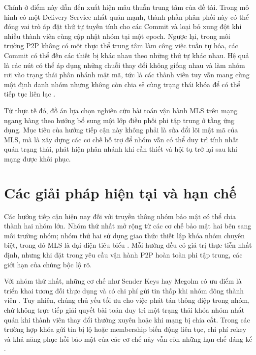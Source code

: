 \documentclass[../DoAn.tex]{subfiles}
\begin{document}
Chính ở điểm này dẫn đến xuất hiện mâu thuẫn trung tâm của đề tài. Trong mô hình có một Delivery Service nhất quán mạnh, thành phần phân phối này có thể đóng vai trò áp đặt thứ tự tuyến tính cho các Commit và loại bỏ xung đột khi nhiều thành viên cùng cập nhật nhóm tại một epoch. Ngược lại, trong môi trường P2P không có một thực thể trung tâm làm công việc tuần tự hóa, các Commit có thể đến các thiết bị khác nhau theo những thứ tự khác nhau. Hệ quả là các nút có thể áp dụng những chuỗi thay đổi không giống nhau và làm nhóm rơi vào trạng thái phân nhánh mật mã, tức là các thành viên tuy vẫn mang cùng một định danh nhóm nhưng không còn chia sẻ cùng trạng thái khóa để có thể tiếp tục liên lạc \cite{rfc9750,alwen2023fork,kohbrok2025dmls}.

Từ thực tế đó, đồ án lựa chọn nghiên cứu bài toán vận hành MLS trên mạng ngang hàng theo hướng bổ sung một lớp điều phối phi tập trung ở tầng ứng dụng. Mục tiêu của hướng tiếp cận này không phải là sửa đổi lõi mật mã của MLS, mà là xây dựng các cơ chế hỗ trợ để nhóm vẫn có thể duy trì tính nhất quán trạng thái, phát hiện phân nhánh khi cần thiết và hội tụ trở lại sau khi mạng được khôi phục.

\section{Các giải pháp hiện tại và hạn chế}
\label{sec:giaiphap}

Các hướng tiếp cận hiện nay đối với truyền thông nhóm bảo mật có thể chia thành hai nhóm lớn. Nhóm thứ nhất mở rộng từ các cơ chế bảo mật hai bên sang môi trường nhóm; nhóm thứ hai sử dụng giao thức thiết lập khóa nhóm chuyên biệt, trong đó MLS là đại diện tiêu biểu \cite{balbas2023senderkeys,ginesin2024matrix,rfc9420}. Mỗi hướng đều có giá trị thực tiễn nhất định, nhưng khi đặt trong yêu cầu vận hành P2P hoàn toàn phi tập trung, các giới hạn của chúng bộc lộ rõ.

Với nhóm thứ nhất, những cơ chế như Sender Keys hay Megolm có ưu điểm là triển khai tương đối thực dụng và có chi phí gửi tin thấp khi nhóm đông thành viên \cite{balbas2023senderkeys,ginesin2024matrix}. Tuy nhiên, chúng chủ yếu tối ưu cho việc phát tán thông điệp trong nhóm, chứ không trực tiếp giải quyết bài toán duy trì một trạng thái khóa nhóm nhất quán khi thành viên thay đổi thường xuyên hoặc khi mạng bị chia cắt. Trong các trường hợp khóa gửi tin bị lộ hoặc membership biến động liên tục, chi phí rekey và khả năng phục hồi bảo mật của các cơ chế này vẫn còn những hạn chế đáng kể \cite{balbas2023senderkeys,ginesin2024matrix}.
\end{document}
